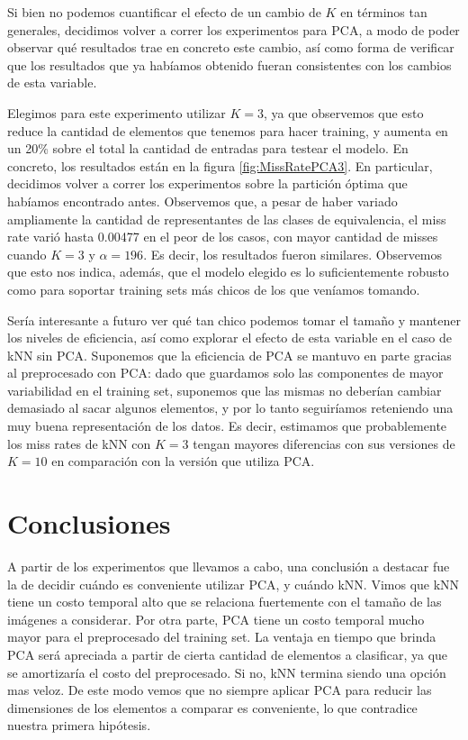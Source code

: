 \documentclass{article}
\begin{document}
Si bien no podemos cuantificar el efecto de un cambio de $K$ en términos tan generales, decidimos volver a correr los experimentos para PCA, a modo de poder observar qué resultados trae en concreto este cambio, así como forma de verificar que los resultados que ya habíamos obtenido fueran consistentes con los cambios de esta variable.

Elegimos para este experimento utilizar $K = 3$, ya que observemos que esto reduce la cantidad de elementos que tenemos para hacer training, y aumenta en un 20\% sobre el total la cantidad de entradas para testear el modelo. En concreto, los resultados están en la figura \ref{fig:MissRatePCA3}. En particular, decidimos volver a correr los experimentos sobre la partición óptima que habíamos encontrado antes. Observemos que, a pesar de haber variado ampliamente la cantidad de representantes de las clases de equivalencia, el miss rate varió hasta 0.00477 en el peor de los casos, con mayor cantidad de misses cuando $K=3$ y $\alpha = 196$. Es decir, los resultados fueron similares. Observemos que esto nos indica, además, que el modelo elegido es lo suficientemente robusto como para soportar training sets más chicos de los que veníamos tomando.

Sería interesante a futuro ver qué tan chico podemos tomar el tamaño y mantener los niveles de eficiencia, así como explorar el efecto de esta variable en el caso de kNN sin PCA. Suponemos que la eficiencia de PCA se mantuvo en parte gracias al preprocesado con PCA: dado que guardamos solo las componentes de mayor variabilidad en el training set, suponemos que las mismas no deberían cambiar demasiado al sacar algunos elementos, y por lo tanto seguiríamos reteniendo una muy buena representación de los datos. Es decir, estimamos que probablemente los miss rates de kNN con $K=3$ tengan mayores diferencias con sus versiones de $K=10$ en comparación con la versión que utiliza PCA.

\section*{Conclusiones}

A partir de los experimentos que llevamos a cabo, una conclusión a destacar fue la de decidir cuándo es conveniente utilizar PCA, y cuándo kNN. Vimos que kNN tiene un costo temporal alto que se relaciona fuertemente con el tamaño de las imágenes a considerar. Por otra parte, PCA tiene un costo temporal mucho mayor para el preprocesado del training set. La ventaja en tiempo que brinda PCA será apreciada a partir de cierta cantidad de elementos a clasificar, ya que se amortizaría el costo del preprocesado. Si no, kNN termina siendo una opción mas veloz. De este modo vemos que no siempre aplicar PCA para reducir las dimensiones de los elementos a comparar es conveniente, lo que contradice nuestra primera hipótesis.
\end{document}
